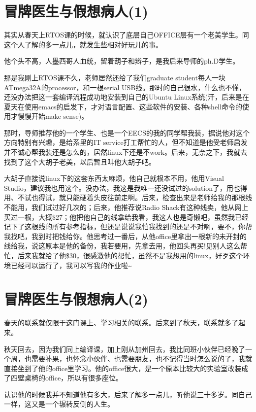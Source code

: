 \documentclass[12pt]{book}
\begin{document}
\section{冒牌医生与假想病人(1)}
\label{sec-18-1}

其实从春天上RTOS课的时候，就认识了底层自己OFFICE层有一个老美学生。同这个人了解的多一点儿，就发生些相对好玩儿的事。

他个头不高，人墨西哥人血统，留着葫子和辫子，是我后来导师的ph.D学生。

那是我刚上RTOS课不久，老师居然还给了我们graduate student每人一块ATmega32A的processor，和一根serial USB线。那时的自己很水，什么也不懂，还没办法把这一套编译流程成功地安装到自己的Ubuntu Linux系统(汗，后来是在夏天在使用emacs的启发下，才对语言配置、这些软件的安装、各种shell命令的使用才慢慢开始make sense)。

那时，导师推荐他的一个学生、也是一个EECS的我的同学帮我装，据说他对这个方向特别有兴趣，是给系里的IT service打工帮忙的人，但不知道是他受老师启发并不诚心帮我装还是怎么的，居然linux下还是不work。后来，无奈之下，我就去找到了这个大胡子老美，以后暂且叫他大胡子吧。

大胡子直接说linux下的这套东西太麻烦，他自己就根本不用，他用Visual Studio，建议我也用这个。没办法，我这是我唯一还没试过的solution了，用也得用、不试也得试，就只能硬着头皮往前走啊。后来，检查出来是老师给我的那根线不能用，我们试过好几次的；后来，他推荐说Radio Shack有这种线卖，他从网上买过一根，大概\$27；他把他自己的线拿给我看，我这人也是奇懒吧，虽然我已经记下了这根线的所有参考指标，但还是说说我怕我找到的还是不对啊，要不，你帮我找吧，我到时把钱给你。他思考过一番后，从他office里拿出一根新的未开封的线给我，说这原本是他的备份，我若要用，先拿去用，他回头再买!见别人这么帮忙，后来我就给了他\$30，很感激他的帮忙，虽然不是我想用的linux，好歹这个环境已经可以运行了，我可以写我的作业啦\textasciitilde{}~

\section{冒牌医生与假想病人(2)}
\label{sec-18-2}

春天的联系就仅限于这门课上、学习相关的联系。后来到了秋天，联系就多了起来。

秋天回去，因为我们同上编译课，加上刚从加州回去，我比同班小伙伴已经晚了一个周，也需要补果，也怀念小伙伴、也需要朋友，也不记得当时怎么说的了，我就直接坐到了他的office里学习。他的office很大，是一个原本比较大的实验室改装成了四壁桌椅的office，所以有很多座位。

认识他的时候我并不知道他有多大，后来了解多一点儿，听他说三十多岁。同自己一样，这又是一个辗转反侧的人生。
\end{document}
